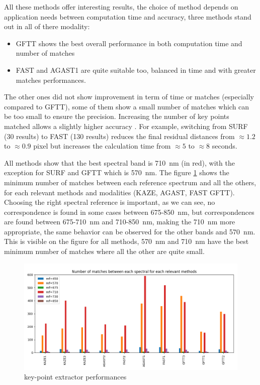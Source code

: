 \documentclass[]{elsarticle}
\begin{document}
	All these methods offer interesting results, the choice of method depends on application needs between computation time and accuracy,
	three methods stand out in all of there modality:
	\begin{itemize}
		\item GFTT shows the best overall performance in both computation time and number of matches
		\item FAST and AGAST1 are quite suitable too, balanced in time and with greater matches performances.
	\end{itemize}
	
	\noindent
	The other ones did not show improvement in term of time or matches (especially compared to GFTT),
	some of them show a small number of matches which can be too small to ensure the precision.
	Increasing the number of key points matched allows a slightly higher accuracy \cite{DantasDiasJunior}.
	For example, switching from SURF (30 results) to FAST (130 results) reduces the final residual distances
	from $\approx 1.2$ to $\approx 0.9$ pixel but increases the calculation time from $\approx 5$ to $\approx 8$ seconds.
	\\
	\par All methods show that the best spectral band is \SI{710}{\nano\meter} (in red), with the exception for SURF and GFTT which is \SI{570}{\nano\meter}.
	The figure \ref{fig:features-GFTT-performances} shows the minimum number of matches between each reference spectrum and all the others, for each relevant methods and modalities (KAZE, AGAST, FAST GFTT).
	Choosing the right spectral reference is important, as we can see, no correspondence is found in some cases between 675-\SI{850}{\nano\meter},
	but correspondences are found between 675-\SI{710}{\nano\meter} and 710-\SI{850}{\nano\meter},
	making the \SI{710}{\nano\meter} more appropriate,
	the same behavior can be observed for the other bands and \SI{570}{\nano\meter}.
	This is visible on the figure for all methods, \SI{570}{\nano\meter} and \SI{710}{\nano\meter} have the best minimum number of matches where all the other are quite small.
	
	\begin{figure}[H]
		\centering
		\includegraphics[width=0.9\linewidth]{../figures/comparaison-keypoint-matching-reference-merged}
		\caption{key-point extractor performances}
		\label{fig:features-GFTT-performances}
	\end{figure}
	
\end{document}
